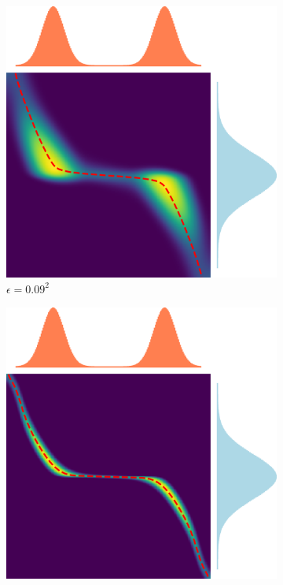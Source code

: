 \begin{figure}[h]
     \centering
     \begin{subfigure}[b]{0.49\textwidth}
         \centering
         \includegraphics[width=\textwidth]{samples/2/bimodal_transport_histograms_eps_081.png}
         \caption{$\epsilon = 0.09^2$}
     \end{subfigure}
     \hfill
     \begin{subfigure}[b]{0.49\textwidth}
         \centering
         \includegraphics[width=\textwidth]{samples/2/bimodal_transport_histograms_eps_004.png}

\end{subfigure}
\end{figure}
